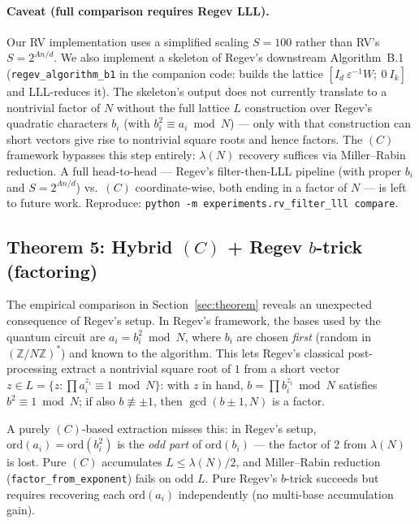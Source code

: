 \documentclass[11pt]{article}
\begin{document}
\paragraph{Caveat (full comparison requires Regev LLL).} Our RV implementation uses a simplified scaling $S = 100$ rather than RV's $S = 2^{An/d}$. We also implement a skeleton of Regev's downstream Algorithm~B.1 (\texttt{regev\_algorithm\_b1} in the companion code: builds the lattice $[I_d \ \varepsilon^{-1} W; \ 0 \ I_k]$ and LLL-reduces it). The skeleton's output does not currently translate to a nontrivial factor of $N$ without the full lattice $L$ construction over Regev's quadratic characters $b_i$ (with $b_i^2 \equiv a_i \bmod N$) --- only with that construction can short vectors give rise to nontrivial square roots and hence factors. The $(C)$ framework bypasses this step entirely: $\lambda(N)$ recovery suffices via Miller--Rabin reduction. A full head-to-head --- Regev's filter-then-LLL pipeline (with proper $b_i$ and $S = 2^{An/d}$) vs.\ $(C)$ coordinate-wise, both ending in a factor of $N$ --- is left to future work. Reproduce: \texttt{python -m experiments.rv\_filter\_lll compare}.

\subsection{Theorem 5: Hybrid $(C)$ + Regev $b$-trick (factoring)}

The empirical comparison in Section~\ref{sec:theorem} reveals an unexpected consequence of Regev's setup. In Regev's framework, the bases used by the quantum circuit are $a_i = b_i^2 \bmod N$, where $b_i$ are chosen \emph{first} (random in $(\mathbb{Z}/N\mathbb{Z})^*$) and known to the algorithm. This lets Regev's classical post-processing extract a nontrivial square root of $1$ from a short vector $z \in L = \{z : \prod a_i^{z_i} \equiv 1 \bmod N\}$: with $z$ in hand, $b = \prod b_i^{z_i} \bmod N$ satisfies $b^2 \equiv 1 \bmod N$; if also $b \not\equiv \pm 1$, then $\gcd(b \pm 1, N)$ is a factor.

A purely $(C)$-based extraction misses this: in Regev's setup, $\mathrm{ord}(a_i) = \mathrm{ord}(b_i^2)$ is the \emph{odd part} of $\mathrm{ord}(b_i)$ --- the factor of 2 from $\lambda(N)$ is lost. Pure $(C)$ accumulates $L \leq \lambda(N)/2$, and Miller--Rabin reduction (\texttt{factor\_from\_exponent}) fails on odd $L$. Pure Regev's $b$-trick succeeds but requires recovering each $\mathrm{ord}(a_i)$ independently (no multi-base accumulation gain).
\end{document}
